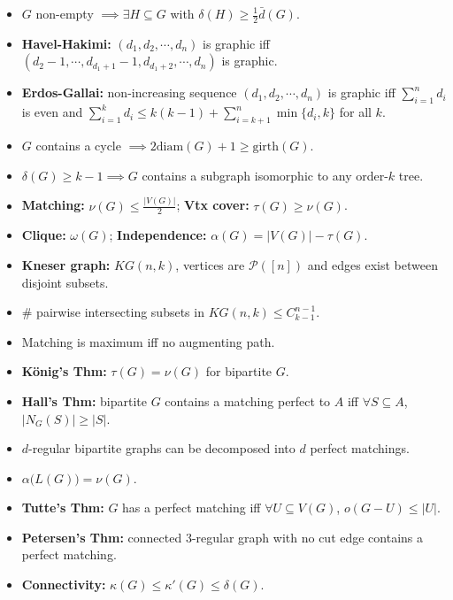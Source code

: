 \documentclass[10pt]{article}
\newcommand{\abs}[1]{\left\lvert#1\right\rvert}
\begin{document}
    \begin{multicols*}{3}
        \begin{itemize}
            \item $G$ non-empty $\implies \exists H \subseteq G$ with $\delta(H) \geq \frac{1}{2} \bar{d}(G)$.
            \item \textbf{Havel-Hakimi:} $(d_1, d_2, \cdots, d_n)$ is graphic iff $(d_2 - 1, \cdots, d_{d_1 + 1} - 1, d_{d_1 + 2}, \cdots, d_n)$ is graphic.
            \item \textbf{Erdos-Gallai:} non-increasing sequence $(d_1, d_2, \cdots, d_n)$ is graphic iff $\sum_{i = 1}^n d_i$ is even and $\sum_{i = 1}^{k} d_i \leq k(k - 1) + \sum_{i = k + 1}^{n}\min\{d_i, k\}$ for all $k$.
            \item $G$ contains a cycle $\implies 2\mathrm{diam}(G) + 1 \geq \mathrm{girth}(G)$.
            \item $\delta(G) \geq k - 1 \implies G$ contains a subgraph isomorphic to any order-$k$ tree.
            \item \textbf{Matching:} $\nu(G) \leq \frac{\abs{V(G)}}{2}$; \textbf{Vtx cover:} $\tau(G) \geq \nu(G)$.
            \item \textbf{Clique:} $\omega(G)$; \textbf{Independence:} $\alpha(G) = \abs{V(G)} - \tau(G)$.
            \item \textbf{Kneser graph:} $KG(n, k)$, vertices are $\mathcal{P}([n])$ and edges exist between disjoint subsets.
            \item \# pairwise intersecting subsets in $KG(n, k) \leq C^{n - 1}_{k - 1}$.
            \item Matching is maximum iff no augmenting path.
            \item \textbf{K\"{o}nig's Thm:} $\tau(G) = \nu(G)$ for bipartite $G$.
            \item \textbf{Hall's Thm:} bipartite $G$ contains a matching perfect to $A$ iff $\forall S \subseteq A$, $\abs{N_G(S)} \geq \abs{S}$.
            \item $d$-regular bipartite graphs can be decomposed into $d$ perfect matchings.
            \item $\alpha\bigl(L(G)\bigr) = \nu(G)$.        
            \item \textbf{Tutte's Thm:} $G$ has a perfect matching iff $\forall U \subseteq V(G)$, $o(G - U) \leq \abs{U}$. 
            \item \textbf{Petersen's Thm:} connected $3$-regular graph with no cut edge contains a perfect matching.  
            \item \textbf{Connectivity:} $\kappa(G) \leq \kappa'(G) \leq \delta(G)$.

\end{itemize}
\end{multicols*}
\end{document}
